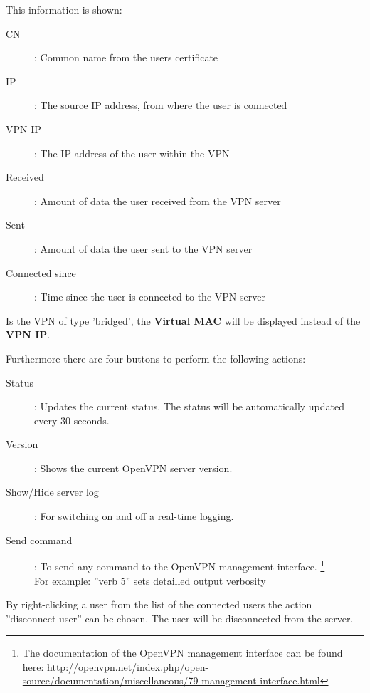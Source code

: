 
\nl This information is shown:

\begin{description}
   \item [CN]: Common name from the users certificate
   \item [IP]: The source IP address, from where the user is connected
   \item [VPN IP]: The IP address of the user within the VPN
   \item [Received]: Amount of data the user received from the VPN server
   \item [Sent]: Amount of data the user sent to the VPN server
   \item [Connected since]: Time since the user is connected to the VPN
server
\end{description}

\nl Is the VPN of type 'bridged', the \textbf{Virtual MAC} will be displayed
instead of the \textbf{VPN IP}.

\nl Furthermore there are four buttons to perform the following actions:

\begin{description}
   \item [Status]: Updates the current status. The status will be automatically
updated every 30 seconds.
   \item [Version]: Shows the current OpenVPN server version.
   \item [Show/Hide server log]: For switching on and off a real-time logging.
   \item [Send command]: To send any command to the OpenVPN management interface.
        \footnote{The documentation of the OpenVPN management interface can be found here:
	    \url{http://openvpn.net/index.php/open-source/documentation/miscellaneous/79-management-interface.html}}
        \\ For example: ''verb 5'' sets detailled output verbosity
\end{description}


\nl By right-clicking a user from the list of the connected users the action
''disconnect user'' can be chosen. The user will be disconnected from the
server.

\newpage




